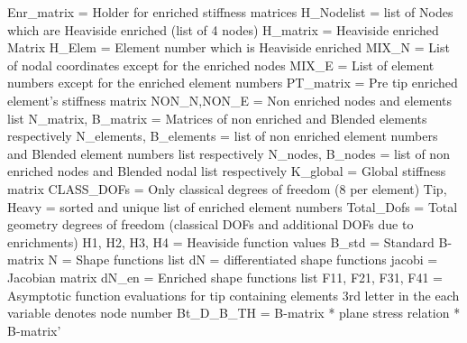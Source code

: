\documentclass[fleqn, 12.5pt,a4paper]{report}
\begin{document}
Enr{\_}matrix = Holder for enriched stiffness matrices\newline
H{\_}Nodelist = list of Nodes which are Heaviside enriched (list of 4 nodes)\newline
H{\_}matrix = Heaviside enriched Matrix\newline
H{\_}Elem = Element number which is Heaviside enriched\newline
MIX{\_}N = List of nodal coordinates except for the enriched nodes \newline
MIX{\_}E = List of element numbers except for the enriched element numbers\newline
PT{\_}matrix = Pre tip enriched element's stiffness matrix\newline
NON{\_}N,NON{\_}E  = Non enriched nodes and elements list\newline
N{\_}matrix, B{\_}matrix = Matrices of non enriched and Blended elements respectively \newline
N{\_}elements, B{\_}elements = list of non enriched element numbers and Blended element numbers  list respectively\newline
N{\_}nodes, B{\_}nodes = list of non enriched nodes and Blended nodal list respectively\newline
K{\_}global = Global stiffness matrix\newline
CLASS{\_}DOFs = Only classical degrees of freedom (8 per element)\newline
Tip, Heavy = sorted and unique list of enriched element numbers\newline
Total{\_}Dofs = Total geometry degrees of freedom (classical DOFs and additional DOFs due to enrichments)\newline
H1, H2, H3, H4 = Heaviside function values\newline
B{\_}std = Standard B-matrix\newline
N = Shape functions list\newline
dN = differentiated shape functions\newline
jacobi = Jacobian matrix\newline
dN{\_}en = Enriched shape functions list\newline
F11, F21, F31, F41 = Asymptotic function evaluations for tip containing elements \newline
3rd letter in the each variable denotes node number\newline
Bt{\_}D{\_}B{\_}TH = B-matrix * plane stress relation * B-matrix'\newline
\end{document}
